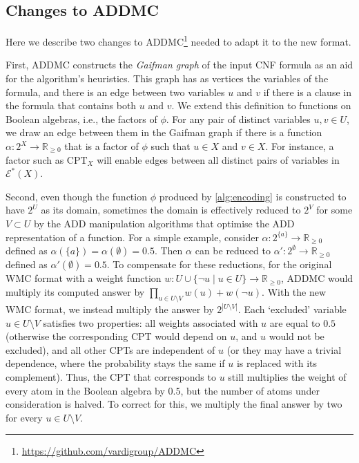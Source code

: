 \documentclass{article}
\begin{document}
\subsection{Changes to ADDMC}

Here we describe two changes to
ADDMC\footnote{\url{https://github.com/vardigroup/ADDMC}}
\cite{DBLP:conf/aaai/DudekPV20} needed to adapt it to the new format.

First, ADDMC constructs the \emph{Gaifman graph} \cite{gaifman1982local} of the
input CNF formula as an aid for the algorithm's heuristics. This graph has as
vertices the variables of the formula, and there is an edge between two
variables $u$ and $v$ if there is a clause in the formula that contains both $u$
and $v$. We extend this definition to functions on Boolean algebras, i.e., the
factors of $\phi$. For any pair of distinct variables $u, v \in U$, we draw an
edge between them in the Gaifman graph if there is a function $\alpha\colon 2^X
\to \mathbb{R}_{\ge 0}$ that is a factor of $\phi$ such that $u \in X$ and $v
\in X$. For instance, a factor such as $\mathrm{CPT}_X$ will enable edges
between all distinct pairs of variables in $\mathcal{E}^*(X)$.

Second, even though the function $\phi$ produced by \cref{alg:encoding} is
constructed to have $2^U$ as its domain, sometimes the domain is effectively
reduced to $2^V$ for some $V \subset U$ by the ADD manipulation algorithms that
optimise the ADD representation of a function. For a simple example, consider
$\alpha: 2^{\{a\}} \to \mathbb{R}_{\ge 0}$ defined as $\alpha(\{a\}) =
\alpha(\emptyset) = 0.5$. Then $\alpha$ can be reduced to $\alpha'\colon
2^{\emptyset} \to \mathbb{R}_{\ge 0}$ defined as $\alpha'(\emptyset) = 0.5$. To
compensate for these reductions, for the original WMC format with a weight
function $w\colon U \cup \{ \neg u \mid u \in U \} \to \mathbb{R}_{\ge 0}$,
ADDMC would multiply its computed answer by $\prod_{u \in U \setminus V} w(u) +
w(\neg u)$. With the new WMC format, we instead multiply the answer by $2^{|U
  \setminus V|}$. Each `excluded' variable $u \in U \setminus V$ satisfies two
properties: all weights associated with $u$ are equal to $0.5$ (otherwise the
corresponding CPT would depend on $u$, and $u$ would not be excluded), and all
other CPTs are independent of $u$ (or they may have a trivial dependence, where
the probability stays the same if $u$ is replaced with its complement). Thus,
the CPT that corresponds to $u$ still multiplies the weight of every atom in the
Boolean algebra by $0.5$, but the number of atoms under consideration is halved.
To correct for this, we multiply the final answer by two for every $u \in U
\setminus V$.
\end{document}

